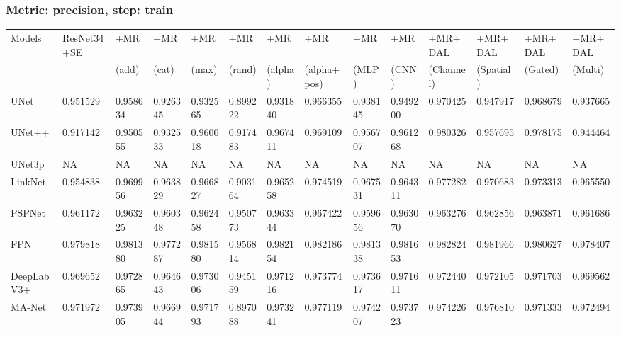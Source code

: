 \documentclass{article}
\begin{document}
\subsubsection{Metric: precision, step: train}
\begin{tabular}{llllllllllllll}
\toprule
Models & ResNet34+SE & +MR  & +MR  & +MR  & +MR  & +MR  & +MR  & +MR  & +MR  & +MR+DAL & +MR+DAL & +MR+DAL & +MR+DAL \\
       &             &  (add) &  (cat) &  (max) &  (rand) &  (alpha) &  (alpha+pos) &  (MLP) &  (CNN) & (Channel) & (Spatial) & (Gated) & (Multi) \\
\midrule
UNet & 0.951529 & 0.958634 & 0.926345 & 0.932565 & 0.899222 & 0.931840 & 0.966355 & 0.938145 & 0.949200 & 0.970425 & 0.947917 & 0.968679 & 0.937665 \\
UNet++ & 0.917142 & 0.950555 & 0.932533 & 0.960018 & 0.917483 & 0.967411 & 0.969109 & 0.956707 & 0.961268 & 0.980326 & 0.957695 & 0.978175 & 0.944464 \\
UNet3p & NA & NA & NA & NA & NA & NA & NA & NA & NA & NA & NA & NA & NA \\
LinkNet & 0.954838 & 0.969956 & 0.963829 & 0.966827 & 0.903164 & 0.965258 & 0.974519 & 0.967531 & 0.964311 & 0.977282 & 0.970683 & 0.973313 & 0.965550 \\
PSPNet & 0.961172 & 0.963225 & 0.960348 & 0.962458 & 0.950773 & 0.963344 & 0.967422 & 0.959656 & 0.963070 & 0.963276 & 0.962856 & 0.963871 & 0.961686 \\
FPN & 0.979818 & 0.981380 & 0.977287 & 0.981580 & 0.956814 & 0.982154 & 0.982186 & 0.981338 & 0.981653 & 0.982824 & 0.981966 & 0.980627 & 0.978407 \\
DeepLabV3+ & 0.969652 & 0.972865 & 0.964643 & 0.973006 & 0.945159 & 0.971216 & 0.973774 & 0.973617 & 0.971611 & 0.972440 & 0.972105 & 0.971703 & 0.969562 \\
MA-Net & 0.971972 & 0.973905 & 0.966944 & 0.971793 & 0.897088 & 0.973241 & 0.977119 & 0.974207 & 0.973723 & 0.974226 & 0.976810 & 0.971333 & 0.972494 \\
\bottomrule
\end{tabular}
\end{document}
